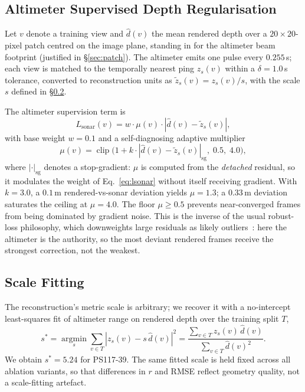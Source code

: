 \documentclass[conference]{IEEEtran}
\begin{document}
\subsection{Altimeter Supervised Depth Regularisation}
\label{sec:method-b}

Let $v$ denote a training view and $\hat{d}(v)$ the mean rendered depth over
a $20{\times}20$-pixel patch centred on the image plane, standing in for the
altimeter beam footprint (justified in \S\ref{sec:patch}). The altimeter
emits one pulse every $0.255$\,s; each view is matched to the temporally
nearest ping $z_s(v)$ within a $\delta = 1.0$\,s tolerance, converted to
reconstruction units as $\tilde{z}_s(v) = z_s(v)/s$, with the scale $s$
defined in \S\ref{sec:scale}.

The altimeter supervision term is
\begin{equation}
L_{\text{sonar}}(v) = w \cdot \mu(v) \cdot \left| \hat{d}(v) - \tilde{z}_s(v) \right|,
\label{eq:lsonar}
\end{equation}
with base weight $w = 0.1$ and a self-diagnosing adaptive multiplier
\begin{equation}
\mu(v) = \operatorname{clip}\!\big(1 + k \cdot |\hat{d}(v) - \tilde{z}_s(v)|_{\text{sg}},\; 0.5,\; 4.0\big),
\label{eq:mu}
\end{equation}
where $|\cdot|_{\text{sg}}$ denotes a stop-gradient: $\mu$ is computed from
the \emph{detached} residual, so it modulates the weight of
Eq.~\eqref{eq:lsonar} without itself receiving gradient. With $k = 3.0$, a
$0.1$\,m rendered-vs-sonar deviation yields $\mu = 1.3$; a $0.33$\,m
deviation saturates the ceiling at $\mu = 4.0$. The floor $\mu \geq 0.5$
prevents near-converged frames from being dominated by gradient noise. This
is the inverse of the usual robust-loss philosophy, which downweights large
residuals as likely outliers~\cite{sabour2024robustnerf}: here the altimeter is the
authority, so the most deviant rendered frames receive the strongest
correction, not the weakest.

\subsection{Scale Fitting}
\label{sec:scale}

The reconstruction's metric scale is arbitrary; we recover it with a
no-intercept least-squares fit of altimeter range on rendered depth over the
training split $T$,
\begin{equation}
s^{*} = \operatorname*{argmin}_{s} \sum_{v \in T} \left| z_s(v) - s\,\hat{d}(v) \right|^2
= \frac{\sum_{v \in T} z_s(v)\,\hat{d}(v)}{\sum_{v \in T} \hat{d}(v)^2}.
\label{eq:scale}
\end{equation}
We obtain $s^{*} = 5.24$ for PS117-39. The same fitted scale is held fixed
across all ablation variants, so that differences in $r$ and RMSE reflect geometry quality, not a
scale-fitting artefact.
\end{document}
